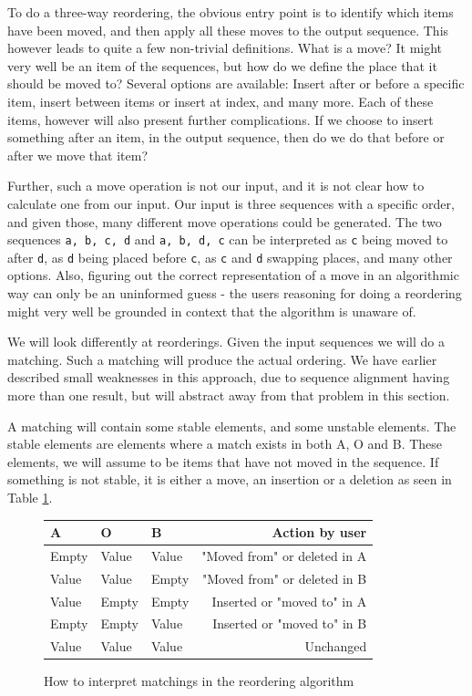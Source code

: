 \documentclass[11pt]{article}
\begin{document}
To do a three-way reordering, the obvious entry point is to identify which items have been moved, and then apply all these moves to the output sequence. This however leads to quite a few non-trivial definitions. What is a move? It might very well be an item of the sequences, but how do we define the place that it should be moved to? Several options are available: Insert after or before a specific item, insert between items or insert at index, and many more. Each of these items, however will also present further complications. If we choose to insert something after an item, in the output sequence, then do we do that before or after we move that item?

Further, such a move operation is not our input, and it is not clear how to calculate one from our input. Our input is three sequences with a specific order, and given those, many different move operations could be generated. The two sequences \texttt{a, b, c, d} and \texttt{a, b, d, c} can be interpreted as \texttt{c} being moved to after \texttt{d}, as \texttt{d} being placed before \texttt{c}, as \texttt{c} and \texttt{d} swapping places, and many other options. Also, figuring out the correct representation of a move in an algorithmic way can only be an uninformed guess - the users reasoning for doing a reordering might very well be grounded in context that the algorithm is unaware of.

We will look differently at reorderings. Given the input sequences we will do a matching. Such a matching will produce the actual ordering. We have earlier described small weaknesses in this approach, due to sequence alignment having more than one result, but will abstract away from that problem in this section.

A matching will contain some stable elements, and some unstable elements. The stable elements are elements where a match exists in both A, O and B. These elements, we will assume to be items that have not moved in the sequence. If something is not stable, it is either a move, an insertion or a deletion as seen in Table \ref{ReorderingTable}.

\begin{figure}
\centering
\begin{tabular}{ | l | l | l || r |}
  \hline                        
   \textbf{A} & \textbf{O} & \textbf{B} & \textbf{Action by user} \\
  \hline                        
  Empty & Value & Value & "Moved from" or deleted in A \\
  Value & Value & Empty & "Moved from" or deleted in B \\
  Value & Empty & Empty & Inserted or "moved to" in A \\
  Empty & Empty & Value & Inserted or "moved to" in B \\
  Value & Value & Value & Unchanged \\
  \hline  
\end{tabular}
  \caption{How to interpret matchings in the reordering algorithm}
\label{ReorderingTable}
\end{figure}
\end{document}
